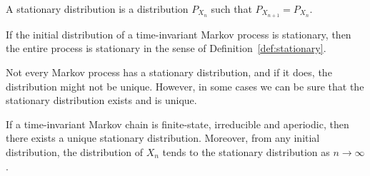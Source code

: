 \begin{definition}
A stationary distribution is a distribution $P_{X_n}$ such that $P_{X_{n+1}} = P_{X_n}$.
\end{definition}
If the initial distribution of a time-invariant Markov process is stationary, then the entire process is stationary in the sense of Definition~\ref{def:stationary}.

Not every Markov process has a stationary distribution, and if it does, the distribution might not be unique. However, in some cases we can be sure that the stationary distribution exists and is unique.

\begin{proposition}
If a time-invariant Markov chain is finite-state, irreducible and aperiodic, then there exists a unique stationary distribution. Moreover, from any initial distribution, the distribution of $X_n$ tends to the stationary distribution as $n \to \infty$.
\end{proposition}


